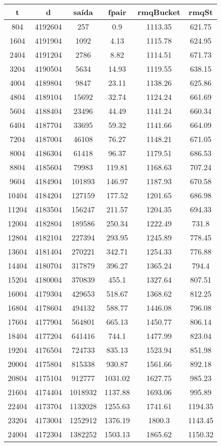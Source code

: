 \begin{tabular}{|c|c|c|c|c|c|}
\hline
\textbf{t} & \textbf{d} & \textbf{saída} & \textbf{fpair} & \textbf{rmqBucket} & \textbf{rmqSt}\\
\hline
804 & 4192604 & 257 & 0.9 & 1113.35 & 621.75\\
\hline
1604 & 4191904 & 1092 & 4.13 & 1115.78 & 624.95\\
\hline
2404 & 4191204 & 2786 & 8.82 & 1114.51 & 671.73\\
\hline
3204 & 4190504 & 5634 & 14.93 & 1119.55 & 638.15\\
\hline
4004 & 4189804 & 9847 & 23.11 & 1138.26 & 625.86\\
\hline
4804 & 4189104 & 15692 & 32.74 & 1124.24 & 661.69\\
\hline
5604 & 4188404 & 23496 & 44.49 & 1141.24 & 660.34\\
\hline
6404 & 4187704 & 33695 & 59.32 & 1141.66 & 664.09\\
\hline
7204 & 4187004 & 46108 & 76.27 & 1148.21 & 671.05\\
\hline
8004 & 4186304 & 61418 & 96.37 & 1179.51 & 686.53\\
\hline
8804 & 4185604 & 79983 & 119.81 & 1168.63 & 707.24\\
\hline
9604 & 4184904 & 101893 & 146.97 & 1187.93 & 670.58\\
\hline
10404 & 4184204 & 127159 & 177.52 & 1201.65 & 686.98\\
\hline
11204 & 4183504 & 156247 & 211.57 & 1204.35 & 694.33\\
\hline
12004 & 4182804 & 189586 & 250.34 & 1222.49 & 731.8\\
\hline
12804 & 4182104 & 227394 & 293.95 & 1245.89 & 778.45\\
\hline
13604 & 4181404 & 270221 & 342.71 & 1254.33 & 776.88\\
\hline
14404 & 4180704 & 317879 & 396.27 & 1365.24 & 794.4\\
\hline
15204 & 4180004 & 370839 & 455.1 & 1327.64 & 807.51\\
\hline
16004 & 4179304 & 429653 & 518.67 & 1368.62 & 812.25\\
\hline
16804 & 4178604 & 494132 & 588.77 & 1446.08 & 796.08\\
\hline
17604 & 4177904 & 564801 & 665.13 & 1450.77 & 806.14\\
\hline
18404 & 4177204 & 641416 & 744.1 & 1477.99 & 823.04\\
\hline
19204 & 4176504 & 724733 & 835.13 & 1523.94 & 851.98\\
\hline
20004 & 4175804 & 815338 & 930.87 & 1561.66 & 892.18\\
\hline
20804 & 4175104 & 912777 & 1031.02 & 1627.75 & 985.23\\
\hline
21604 & 4174404 & 1018932 & 1137.88 & 1693.06 & 995.89\\
\hline
22404 & 4173704 & 1132028 & 1255.63 & 1741.61 & 1194.35\\
\hline
23204 & 4173004 & 1252912 & 1376.19 & 1800.3 & 1143.45\\
\hline
24004 & 4172304 & 1382252 & 1503.13 & 1865.62 & 1150.32\\
\hline
\end{tabular}
